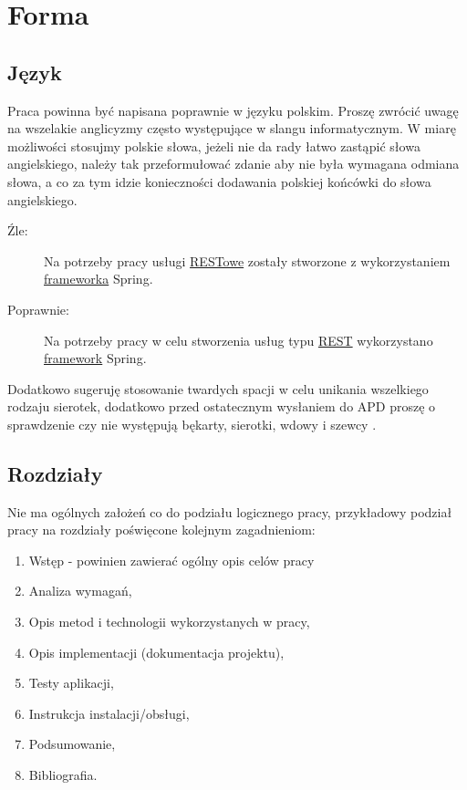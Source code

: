\documentclass[12pt,a4paper]{article}
\begin{document}
\section{Forma}

\subsection{Język}
Praca powinna być napisana poprawnie w języku polskim. Proszę zwrócić uwagę na wszelakie anglicyzmy często występujące w slangu informatycznym. W miarę możliwości stosujmy polskie słowa, jeżeli nie da rady łatwo zastąpić słowa angielskiego, należy tak przeformułować zdanie aby nie była wymagana odmiana słowa, a co za tym idzie konieczności dodawania polskiej końcówki do słowa angielskiego.
\begin{description}
  \item[{\color{red}Źle:}] Na potrzeby pracy usługi \underline{RESTowe} zostały stworzone z wykorzystaniem \underline{frameworka} Spring.
  \item[Poprawnie:] Na potrzeby pracy w celu stworzenia usług typu \underline{REST} wykorzystano \underline{framework} Spring.
\end{description}

Dodatkowo sugeruję stosowanie twardych spacji w celu unikania wszelkiego rodzaju sierotek, dodatkowo przed ostatecznym wysłaniem do APD proszę o sprawdzenie czy nie występują  bękarty, sierotki, wdowy i szewcy \cite{Bekart}.

\subsection{Rozdziały}
Nie ma ogólnych założeń co do podziału logicznego pracy, przykładowy podział pracy na rozdziały poświęcone kolejnym zagadnieniom:
\begin{enumerate}
\item Wstęp - powinien zawierać ogólny opis celów pracy
\item Analiza wymagań,
\item Opis metod i technologii wykorzystanych w pracy,
\item Opis implementacji (dokumentacja projektu),
\item Testy aplikacji,
\item Instrukcja instalacji/obsługi,
\item Podsumowanie,
\item Bibliografia.
\end{enumerate}
\end{document}
